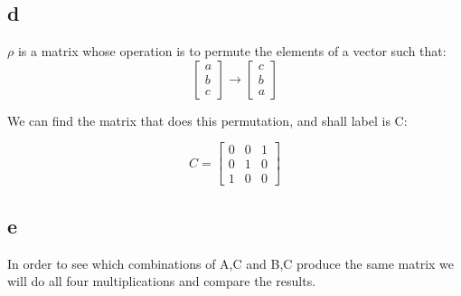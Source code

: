 \documentclass[12pt]{article}
\begin{document}
\subsection*{d}

$\rho$ is a matrix whose operation is to permute the elements of a vector such that:\\

\[
\begin{bmatrix}
a\\
b\\
c
\end{bmatrix}
\rightarrow
\begin{bmatrix}
c\\
b\\
a
\end{bmatrix}
\]

We can find the matrix that does this permutation, and shall label is C:

\[
C = 
\begin{bmatrix}
0 & 0 & 1\\
0 & 1 & 0\\
1 & 0 & 0
\end{bmatrix}
\] 

\subsection*{e}

In order to see which combinations of A,C and B,C produce the same matrix we will do all four multiplications and compare the results.
\end{document}
